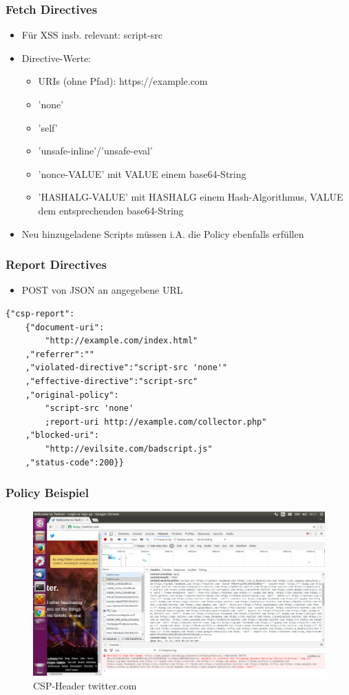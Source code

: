 \documentclass[handout]{beamer}
\begin{document}
\begin{frame}
\frametitle{Fetch Directives}
\begin{itemize}
\item Für XSS insb. relevant: script-src
\item Directive-Werte:
\begin{itemize}
\item URIs (ohne Pfad): https://example.com
\item 'none'
\item 'self'
\item 'unsafe-inline'/'unsafe-eval'
\item 'nonce-VALUE' mit VALUE einem base64-String
\item 'HASHALG-VALUE' mit HASHALG einem Hash-Algorithmus, VALUE dem entsprechenden base64-String
\end{itemize}
\item Neu hinzugeladene Scripts müssen i.A. die Policy ebenfalls erfüllen
\end{itemize}
\end{frame}


\begin{frame}[fragile]
\frametitle{Report Directives}
\begin{itemize}
\item POST von JSON an angegebene URL
\end{itemize}
\begin{lstlisting}[breaklines=true]
{"csp-report":
	{"document-uri":
		"http://example.com/index.html"
	,"referrer":""
	,"violated-directive":"script-src 'none'"
	,"effective-directive":"script-src"
	,"original-policy":
		"script-src 'none'
		;report-uri http://example.com/collector.php"
	,"blocked-uri":
		"http://evilsite.com/badscript.js"
	,"status-code":200}}
\end{lstlisting}
\end{frame}


\begin{frame}
\frametitle{Policy Beispiel}
\begin{figure}[ht]
	\centering
	\includegraphics[width=12cm]{twitter_csp.png}
	\caption{CSP-Header twitter.com}
\end{figure}
\end{frame}
\end{document}
